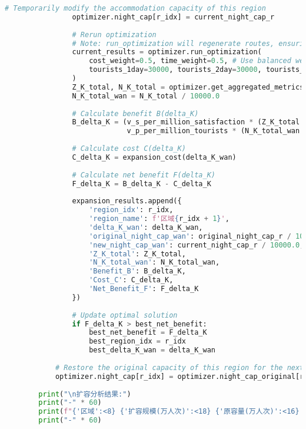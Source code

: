 \begin{lstlisting}[language=Python]
                # Temporarily modify the accommodation capacity of this region
                optimizer.night_cap[r_idx] = current_night_cap_r
                
                # Rerun optimization
                # Note: run_optimization will regenerate routes, ensuring each run is based on the modified capacity
                current_results = optimizer.run_optimization(
                    cost_weight=0.5, time_weight=0.5, # Use balanced weights for expansion analysis
                    tourists_1day=30000, tourists_2day=30000, tourists_3day=20000
                )
                Z_K_total, N_K_total = optimizer.get_aggregated_metrics(current_results)
                N_K_total_wan = N_K_total / 10000.0
    
                # Calculate benefit B(delta_K)
                B_delta_K = (v_s_per_million_satisfaction * (Z_K_total - Z_K0_total) + 
                             v_p_per_million_tourists * (N_K_total_wan - N_K0_total_wan))
                
                # Calculate cost C(delta_K)
                C_delta_K = expansion_cost(delta_K_wan)
                
                # Calculate net benefit F(delta_K)
                F_delta_K = B_delta_K - C_delta_K
                
                expansion_results.append({
                    'region_idx': r_idx,
                    'region_name': f'区域{r_idx + 1}',
                    'delta_K_wan': delta_K_wan,
                    'original_night_cap_wan': original_night_cap_r / 10000.0,
                    'new_night_cap_wan': current_night_cap_r / 10000.0,
                    'Z_K_total': Z_K_total,
                    'N_K_total_wan': N_K_total_wan,
                    'Benefit_B': B_delta_K,
                    'Cost_C': C_delta_K,
                    'Net_Benefit_F': F_delta_K
                })
    
                # Update optimal solution
                if F_delta_K > best_net_benefit:
                    best_net_benefit = F_delta_K
                    best_region_idx = r_idx
                    best_delta_K_wan = delta_K_wan
    
            # Restore the original capacity of this region for the next region's test
            optimizer.night_cap[r_idx] = optimizer.night_cap_original[r_idx]
    
        print("\n扩容分析结果:")
        print("-" * 60)
        print(f"{'区域':<8} {'扩容规模(万人次)':<18} {'原容量(万人次)':<16} {'新容量(万人次)':<16} {'净收益(亿元)':<12}")
        print("-" * 60)
        

\end{lstlisting}
